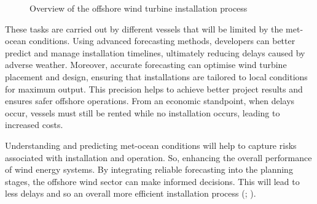 \begin{figure}[h!]
\centering
{}
\caption{Overview of the offshore wind turbine installation process}
\label{fig:installation_process}
\end{figure}

\newpage
These tasks are carried out by different vessels that will be limited by the met-ocean conditions. Using advanced forecasting methods, developers can better predict and manage installation timelines, ultimately reducing delays caused by adverse weather. Moreover, accurate forecasting can optimise wind turbine placement and design, ensuring that installations are tailored to local conditions for maximum output. This precision helps to achieve better project results and ensures safer offshore operations. From an economic standpoint, when delays occur, vessels must still be rented while no installation occurs, leading to increased costs.

Understanding and predicting met-ocean conditions will help to capture risks associated with installation and operation. So, enhancing the overall performance of wind energy systems. By integrating reliable forecasting into the planning stages, the offshore wind sector can make informed decisions. This will lead to less delays and so an overall more efficient installation process (\cite{IEA2021}; \cite{GWEC2024Offshore}).

